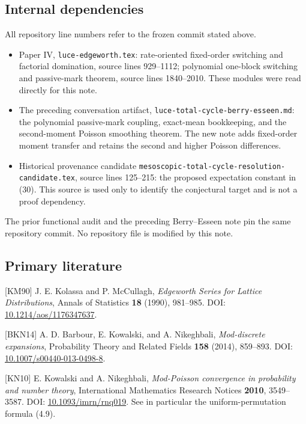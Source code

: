 \documentclass[
  11pt,
]{article}
\providecommand{\tightlist}{%
  \setlength{\itemsep}{0pt}\setlength{\parskip}{0pt}}
\begin{document}
\subsection{Internal dependencies}\label{internal-dependencies}

All repository line numbers refer to the frozen commit stated above.

\begin{itemize}
\tightlist
\item
  Paper IV, \texttt{luce-edgeworth.tex}: rate-oriented fixed-order
  switching and factorial domination, source lines 929--1112; polynomial
  one-block switching and passive-mark theorem, source lines 1840--2010.
  These modules were read directly for this note.
\item
  The preceding conversation artifact,
  \texttt{luce-total-cycle-berry-esseen.md}: the polynomial passive-mark
  coupling, exact-mean bookkeeping, and the second-moment Poisson
  smoothing theorem. The new note adds fixed-order moment transfer and
  retains the second and higher Poisson differences.
\item
  Historical provenance candidate
  \texttt{mesoscopic-total-cycle-resolution-candidate.tex}, source lines
  125--215: the proposed expectation constant in (30). This source is
  used only to identify the conjectural target and is not a proof
  dependency.
\end{itemize}

The prior functional audit and the preceding Berry--Esseen note pin the
same repository commit. No repository file is modified by this note.

\subsection{Primary literature}\label{primary-literature}

{[}KM90{]} J. E. Kolassa and P. McCullagh, \emph{Edgeworth Series for
Lattice Distributions}, Annals of Statistics \textbf{18} (1990),
981--985. DOI:
\href{https://doi.org/10.1214/aos/1176347637}{10.1214/aos/1176347637}.

{[}BKN14{]} A. D. Barbour, E. Kowalski, and A. Nikeghbali,
\emph{Mod-discrete expansions}, Probability Theory and Related Fields
\textbf{158} (2014), 859--893. DOI:
\href{https://doi.org/10.1007/s00440-013-0498-8}{10.1007/s00440-013-0498-8}.

{[}KN10{]} E. Kowalski and A. Nikeghbali, \emph{Mod-Poisson convergence
in probability and number theory}, International Mathematics Research
Notices \textbf{2010}, 3549--3587. DOI:
\href{https://doi.org/10.1093/imrn/rnq019}{10.1093/imrn/rnq019}. See in
particular the uniform-permutation formula (4.9).
\end{document}
